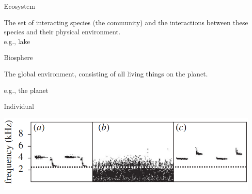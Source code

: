 \documentclass[12pt]{beamer}
\begin{document}
\begin{frame}

	\begin{flushright}
	  \Large \textcolor{boss2}{Ecosystem} 
	\end{flushright}
The set of interacting species (the community) and the interactions between these species and their physical environment. \\

e.g., lake
\end{frame}











\begin{frame}

	\begin{flushright}
	  \Large \textcolor{boss2}{Biosphere} 
	\end{flushright}

The global environment, consisting of all living things on the planet.

e.g., the planet

\end{frame}






























\begin{frame}

	\begin{flushright}
	  \Large \textcolor{boss2}{Individual} 
	\end{flushright}

  \begin{center}
    \includegraphics[width=\textwidth]{figs/individual.png}
  \end{center}
  \let\thefootnote\relax{}

\end{frame}
\end{document}

